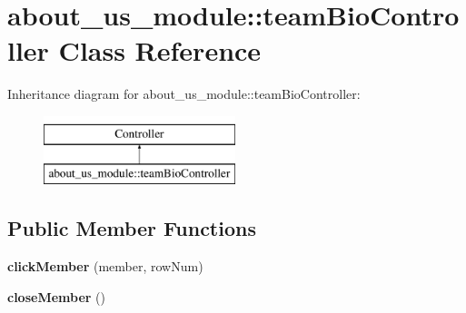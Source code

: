 \hypertarget{classabout__us__module_1_1teamBioController}{\section{about\-\_\-us\-\_\-module\-:\-:team\-Bio\-Controller Class Reference}
\label{classabout__us__module_1_1teamBioController}
}
Inheritance diagram for about\-\_\-us\-\_\-module\-:\-:team\-Bio\-Controller\-:\begin{figure}[H]
\begin{center}
\leavevmode
\includegraphics[height=2.000000cm]{classabout__us__module_1_1teamBioController}
\end{center}
\end{figure}
\subsection*{Public Member Functions}
\begin{DoxyCompactItemize}
\item 
\hypertarget{classabout__us__module_1_1teamBioController_ac4646537f3ad54ad6c57dc39e5aaed6d}{{\bfseries click\-Member} (member, row\-Num)}\label{classabout__us__module_1_1teamBioController_ac4646537f3ad54ad6c57dc39e5aaed6d}

\item 
\hypertarget{classabout__us__module_1_1teamBioController_a5b0629f06fd4589df96f1c17cebb5b52}{{\bfseries close\-Member} ()}\label{classabout__us__module_1_1teamBioController_a5b0629f06fd4589df96f1c17cebb5b52}

\end{DoxyCompactItemize}
